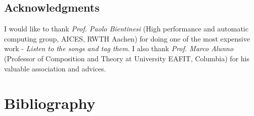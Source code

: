 \documentclass{book}
\begin{document}
\section*{\bf Acknowledgments}
I would like to thank \textit{Prof. Paolo Bientinesi} (High performance and automatic computing group, AICES, RWTH Aachen) for doing one of the most expensive work - \textit{Listen to the songs and tag them}. I also thank  \textit{Prof. Marco Alunno} (Professor of Composition and Theory at University EAFIT, Columbia) for his valuable association and advices.  
\tableofcontents


 





%
%
%
%
%
%


 
\printglossaries
\chapter*{Bibliography}
\printbibliography[type={inproceedings},title={Proceedings},heading=subbibliography]
\printbibliography[type={article},title={Articles},heading=subbibliography]
\printbibliography[keyword={preprint},title={Pre-Prints},heading=subbibliography]
\printbibliography[type={book},title={Books},heading=subbibliography]
\printbibliography[type={misc},title={Misc},heading=subbibliography]
\end{document}
